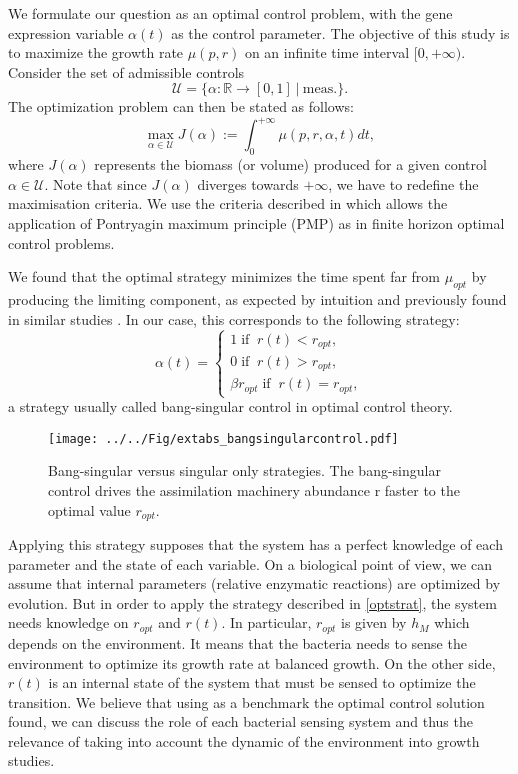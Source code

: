 \documentclass[a4paper, 10pt, conference]{ieeeconf}      %
\begin{document}
We formulate our question as an optimal control problem, with the gene expression variable $\alpha(t)$ as the control parameter.
The objective of this study is to maximize the growth rate $\mu(p,r)$ on an infinite time interval $[0, +\infty)$.
Consider the set of admissible controls
\[
\mathcal{U}=\{\alpha:\mathbb{R} \rightarrow [0,1] \ | \ \mathrm{meas.}\}.
\]
The optimization problem can then be stated as follows:
\begin{equation}\label{Prob}
\max_{\alpha \in \mathcal{U}} J(\alpha):=\int_0^{+\infty} \mu(p, r, \alpha, t) dt,
\end{equation}
where $J(\alpha)$ represents the biomass (or volume) produced for a given control $\alpha\in \mathcal{U}$.
Note that since $J(\alpha)$ diverges towards $+\infty$, we have to redefine the maximisation criteria.
We use the criteria described in \cite{halkin_necessary_1974} which allows the application of Pontryagin maximum principle (PMP) as in finite horizon optimal control problems.

We found that the optimal strategy minimizes the time spent far from $\mu_{opt}$ by producing the limiting component, as expected by intuition and previously found in similar studies \cite{berg_optimal_1998, berg_optimal_2002, pavlov_optimal_2013}. In our case, this corresponds to the following strategy:
\begin{equation}
\alpha(t) = 
\begin{cases}
1 \; \text{if} \;\; r(t)<r_{opt},\\
0 \; \text{if} \;\; r(t)>r_{opt},\\
\beta r_{opt} \; \text{if} \;\; r(t)=r_{opt},
\end{cases}
\label{optstrat}
\end{equation}
a strategy usually called bang-singular control in optimal control theory.

\begin{figure}[h]
\centering
\texttt{[image: ../../Fig/extabs\_bangsingularcontrol.pdf]}
\caption{Bang-singular versus singular only strategies.
The bang-singular control drives the assimilation machinery abundance r faster to the optimal value $r_{opt}$.}
\label{fig::selfrep}
\end{figure}

Applying this strategy supposes that the system has a perfect knowledge of each parameter and the state of each variable.
On a biological point of view, we can assume that internal parameters (relative enzymatic reactions) are optimized by evolution.
But in order to apply the strategy described in \eqref{optstrat}, the system needs knowledge on $r_{opt}$ and $r(t)$.
In particular, $r_{opt}$ is given by $h_M$ which depends on the environment.
It means that the bacteria needs to sense the environment to optimize its growth rate at balanced growth.
On the other side, $r(t)$ is an internal state of the system that must be sensed to optimize the transition.
We believe that using as a benchmark the optimal control solution found, we can discuss the role of each bacterial sensing system and thus the relevance of taking into account the dynamic of the environment into growth studies.
\end{document}
